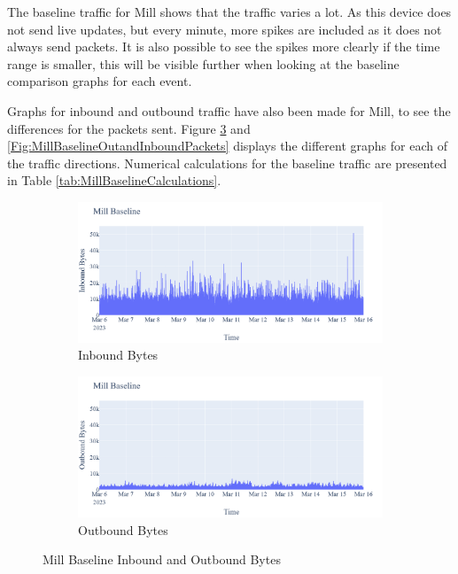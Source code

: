 The baseline traffic for Mill shows that the traffic varies a lot. As this device does not send live updates, but every minute, more spikes are included as it does not always send packets. It is also possible to see the spikes more clearly if the time range is smaller, this will be visible further when looking at the baseline comparison graphs for each event. 

Graphs for inbound and outbound traffic have also been made for Mill, to see the differences for the packets sent. Figure \ref{Fig:MillBaselineOutandInboundBytes} and \ref{Fig:MillBaselineOutandInboundPackets} displays the different graphs for each of the traffic directions. Numerical calculations for the baseline traffic are presented in Table \ref{tab:MillBaselineCalculations}. 

\begin{figure}[H]
    \centering
    \begin{subfigure}[b]{0.7\textwidth}
        \includegraphics[width=\textwidth]{figures/Mill_Baseline_InboundBytes.png}
        \caption{Inbound Bytes}
        \label{fig:MillBaselineInboundBytes}
    \end{subfigure}
    \begin{subfigure}[b]{0.7\textwidth}
        \includegraphics[width=\textwidth]{figures/Mill_Baseline_OutboundBytes.png}
        \caption{Outbound Bytes}
        \label{fig:MillBaselineOutboundBytes}
    \end{subfigure}
    \caption{Mill Baseline Inbound and Outbound Bytes}
    \label{Fig:MillBaselineOutandInboundBytes}
 \end{figure}


